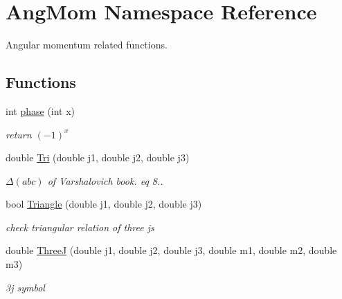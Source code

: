 \hypertarget{namespaceAngMom}{}\section{Ang\+Mom Namespace Reference}
\label{namespaceAngMom}


Angular momentum related functions.  


\subsection*{Functions}
\begin{DoxyCompactItemize}
\item 
\mbox{\label{namespaceAngMom_a7d60974f75948035f4d3dcbc84eaa75e}} 
int \hyperlink{namespaceAngMom_a7d60974f75948035f4d3dcbc84eaa75e}{phase} (int x)
\begin{DoxyCompactList}\small\item\em return $(-1)^x$ \end{DoxyCompactList}\item 
\mbox{\label{namespaceAngMom_a4aeabcf56d4eeda4288b691d982bc926}} 
double \hyperlink{namespaceAngMom_a4aeabcf56d4eeda4288b691d982bc926}{Tri} (double j1, double j2, double j3)
\begin{DoxyCompactList}\small\item\em $\Delta(abc)$ of Varshalovich book. eq 8.. \end{DoxyCompactList}\item 
\mbox{\label{namespaceAngMom_a04a7eee9133f74c10f2f0cc452281a59}} 
bool \hyperlink{namespaceAngMom_a04a7eee9133f74c10f2f0cc452281a59}{Triangle} (double j1, double j2, double j3)
\begin{DoxyCompactList}\small\item\em check triangular relation of three j\textquotesingle{}s \end{DoxyCompactList}\item 
\mbox{\label{namespaceAngMom_a59da9456b43ed70ab90963d8571a4ebd}} 
double \hyperlink{namespaceAngMom_a59da9456b43ed70ab90963d8571a4ebd}{ThreeJ} (double j1, double j2, double j3, double m1, double m2, double m3)
\begin{DoxyCompactList}\small\item\em 3j symbol \end{DoxyCompactList}\item 

\end{DoxyCompactItemize}

